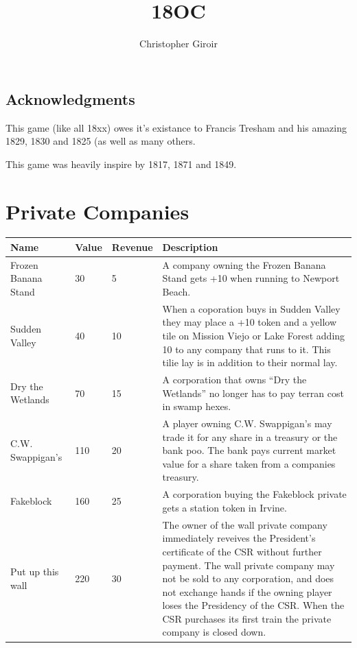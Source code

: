 \documentclass[letterpaper]{article}
\title{\Huge 18OC}
\author{\Large Christopher Giroir}
\begin{document}
\maketitle

\newpage
\tableofcontents
\newpage

\begin{multicols}{2}
    \section{Acknowledgments}

    This game (like all 18xx) owes it's existance to Francis Tresham and his
    amazing 1829, 1830 and 1825 (as well as many others.

    This game was heavily inspire by 1817, 1871 and 1849.
\end{multicols}

\newpage

\section{Private Companies}
\begin{tabularx}{\linewidth}{l|l|l|X}
  \hline
  \textbf{Name} & \textbf{Value} & \textbf{Revenue} & \textbf{Description} \\
  \hline
  \hline
  Frozen Banana Stand & 30 & 5 & A company owning the Frozen Banana Stand gets +10 when running to Newport Beach. \\
  \hline
  Sudden Valley & 40 & 10 & When a coporation buys in Sudden Valley they may place a +10 token and a yellow tile on Mission Viejo or Lake Forest adding 10 to any company that runs to it. This tilie lay is in addition to their normal lay. \\
  \hline
  Dry the Wetlands & 70 & 15 & A corporation that owns ``Dry the Wetlands'' no longer has to pay terran cost in swamp hexes. \\
  \hline
  C.W. Swappigan's & 110 & 20 & A player owning C.W. Swappigan's may trade it for any share in a treasury or the bank poo. The bank pays current market value for a share taken from a companies treasury. \\
  \hline
  Fakeblock & 160 & 25 & A corporation buying the Fakeblock private gets a station token in Irvine. \\
  \hline
  Put up this wall & 220 & 30 & The owner of the wall private company immediately reveives the President's certificate of the CSR without further payment. The wall private company may not be sold to any corporation, and does not exchange hands if the owning player loses the Presidency of the CSR. When the CSR purchases its first train the private company is closed down. \\
  \hline
\end{tabularx}
\end{document}
